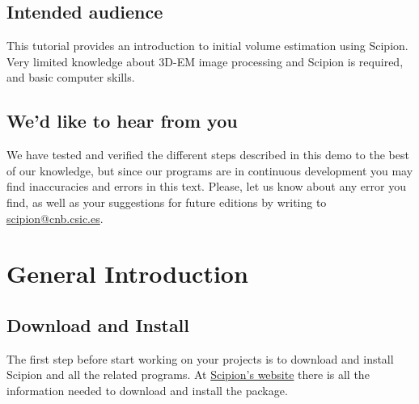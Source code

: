 \documentclass[12pt]{article} %
\begin{document}



\subsection*{Intended audience}

This tutorial provides an introduction to initial volume estimation using Scipion. 
Very limited knowledge about 3D-EM image processing and Scipion is required, and basic computer skills.

\subsection*{We'd like to hear from you}

We have tested and verified the different steps described in this demo
to the best of our knowledge, but since our programs are in continuous
development you may find inaccuracies and errors in this text. Please,
let us know about any error you find, as well as your suggestions for
future editions by writing to
\href{mailto:scipion@cnb.csic.es}{scipion@cnb.csic.es}.

\newpage

\tableofcontents %

\newpage %


\section{General Introduction}

\subsection{Download and Install}

The first step before start working on your projects is to download and
install Scipion and all the related programs. At \href{http://scipionwiki.cnb.csic.es}{Scipion's website} 
there is all the information needed to download and install the package.
\end{document}
